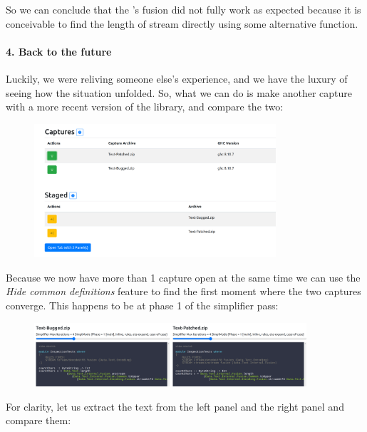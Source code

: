 So we can conclude that the 's fusion did not fully work as expected because it is conceivable to find the
length of stream directly using some alternative  function. 

\paragraph{4. Back to the future}

Luckily, we were reliving someone else's experience, and we have the luxury of seeing how the situation unfolded.
So, what we can do is make another capture with a more recent version of the library, and compare the two:

\begin{figure}[H]
\centering
\includegraphics[width=0.8\textwidth]{figs/countchars_5.png}
\end{figure}

Because we now have more than 1 capture open at the same time we can use the \textit{Hide common definitions} feature to
find the first moment where the two captures converge. This happens to be at phase 1 of the simplifier pass:

\begin{figure}[H]
\centering
\includegraphics[width=0.9\textwidth]{figs/countchars_6.png}
\end{figure}

For clarity, let us extract the text from the left panel and the right panel and compare them:

